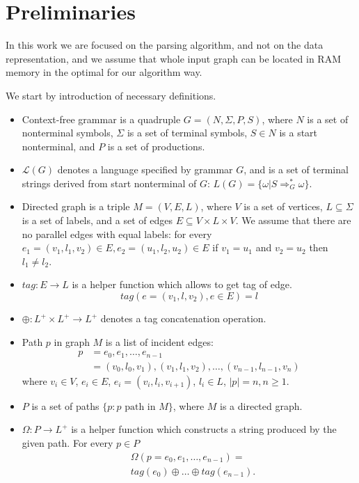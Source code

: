 \section{Preliminaries}

In this work we are focused on the parsing algorithm, and not on the data representation, and we assume that whole input graph can be located in RAM memory in the optimal for our algorithm way.

We start by introduction of necessary definitions.
\begin{itemize}
  \item Context-free grammar is a quadruple $G=(N, \Sigma, P, S)$, where $N$ is a set of nonterminal symbols, $\Sigma$ is a set of terminal symbols, $S \in N$ is a start nonterminal, and $P$ is a set of productions. 
  \item $\mathcal{L}(G)$ denotes a language specified by grammar $G$, and is a set of terminal strings derived from start nonterminal of $G$: $L(G) = \{\omega | S \Rightarrow_{G}^{*} \omega\}$.
  \item Directed graph is a triple $M = (V,E,L)$, where $V$ is a set of vertices, $L \subseteq \Sigma$ is a set of labels, and a set of edges $E\subseteq V\times L\times V$. 
  We assume that there are no parallel edges with equal labels: for every $e_1=(v_1,l_1,v_2) \in E, e_2=(u_1,l_2,u_2) \in E$ if $v_1 = u_1$ and $v_2 = u_2$ then $l_1 \neq l_2$.
  \item $tag: E \rightarrow L$ is a helper function which allows to get tag of edge. $$tag(e = (v_1,l,v_2), e \in E) = l$$
  \item $\oplus: L^+ \times L^+ \rightarrow L^+$ denotes a tag concatenation operation.
  \item Path $p$ in graph $M$ is a list of incident edges: 
  \begin{align*}
   p &= e_0,e_1,\dots,e_{n-1} \\
     &= (v_0,l_0,v_1),(v_1,l_1,v_2),\dots,(v_{n-1},l_{n-1},v_n)
  \end{align*}
  where $v_i \in V$, $e_i \in E$, $e_i=(v_i,l_i,v_{i+1})$, $l_i \in L$, $|p| = n, n \geq 1$. 
  \item $P$  is a set of paths $\{p: p \text{ path in } M\}$, where $M$ is a directed graph.
  \item $\Omega: P \rightarrow L^+$ is a helper function which constructs a string produced by the given path. For every $p \in P$
  \begin{align*}
  & \Omega(p = e_{0},e_{1},\dots,e_{n-1}) = \\
  & tag (e_{0}) \oplus \dots \oplus tag (e_{n-1}).
  \end{align*}
\end{itemize}

